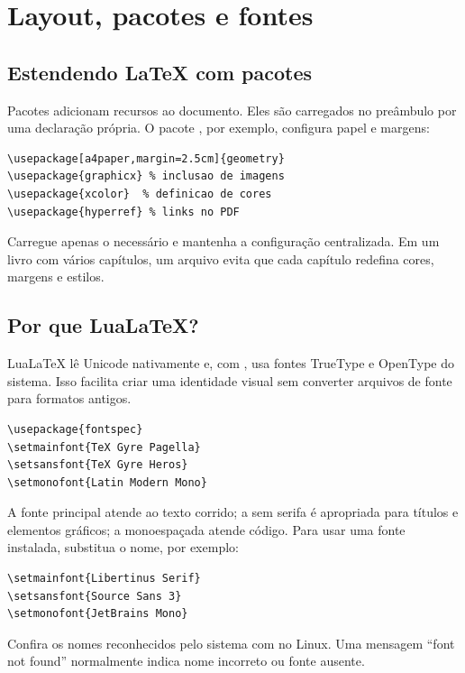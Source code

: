 \chapter{Layout, pacotes e fontes}
\label{chap:layout-fontes}

\section{Estendendo LaTeX com pacotes}

Pacotes adicionam recursos ao documento. Eles são carregados no preâmbulo por
uma declaração própria. O pacote , por exemplo, configura
papel e margens:

\begin{lstlisting}[language=LaTeXBook]
\usepackage[a4paper,margin=2.5cm]{geometry}
\usepackage{graphicx} % inclusao de imagens
\usepackage{xcolor}  % definicao de cores
\usepackage{hyperref} % links no PDF
\end{lstlisting}

Carregue apenas o necessário e mantenha a configuração centralizada. Em um
livro com vários capítulos, um arquivo  evita que cada
capítulo redefina cores, margens e estilos.

\section{Por que LuaLaTeX?}

LuaLaTeX lê Unicode nativamente e, com , usa fontes TrueType e
OpenType do sistema. Isso facilita criar uma identidade visual sem converter
arquivos de fonte para formatos antigos.

\begin{lstlisting}[language=LaTeXBook]
\usepackage{fontspec}
\setmainfont{TeX Gyre Pagella}
\setsansfont{TeX Gyre Heros}
\setmonofont{Latin Modern Mono}
\end{lstlisting}

A fonte principal atende ao texto corrido; a sem serifa é apropriada para
títulos e elementos gráficos; a monoespaçada atende código. Para usar uma fonte
instalada, substitua o nome, por exemplo:

\begin{lstlisting}[language=LaTeXBook]
\setmainfont{Libertinus Serif}
\setsansfont{Source Sans 3}
\setmonofont{JetBrains Mono}
\end{lstlisting}

Confira os nomes reconhecidos pelo sistema com  no Linux. Uma
mensagem ``font not found'' normalmente indica nome incorreto ou fonte ausente.

